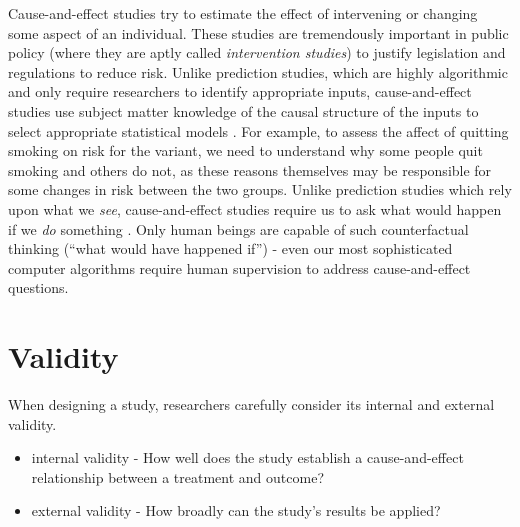 \documentclass[
]{book}
\begin{document}
Cause-and-effect studies try to estimate the effect of intervening or changing some aspect of an individual. These studies are tremendously important in public policy (where they are aptly called \emph{intervention studies}) to justify legislation and regulations to reduce risk. Unlike prediction studies, which are highly algorithmic and only require researchers to identify appropriate inputs, cause-and-effect studies use subject matter knowledge of the causal structure of the inputs to select appropriate statistical models \citep{hernan2019second}. For example, to assess the affect of quitting smoking on risk for the variant, we need to understand why some people quit smoking and others do not, as these reasons themselves may be responsible for some changes in risk between the two groups. Unlike prediction studies which rely upon what we \emph{see}, cause-and-effect studies require us to ask what would happen if we \emph{do} something \citep{pearl2018book}. Only human beings are capable of such counterfactual thinking (``what would have happened if'') - even our most sophisticated computer algorithms require human supervision to address cause-and-effect questions.

\hypertarget{validity}{%
\section{Validity}\label{validity}}

When designing a study, researchers carefully consider its internal and external validity.

\begin{itemize}
\item
  internal validity - How well does the study establish a cause-and-effect relationship between a treatment and outcome?
\item
  external validity - How broadly can the study's results be applied?
\end{itemize}
\end{document}
